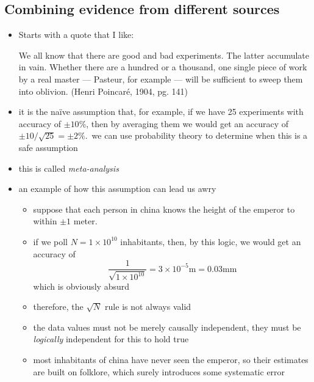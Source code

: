 \documentclass[../jaynes_prob_theory_notes.tex]{subfiles}
\begin{document}
            \subsection{Combining evidence from different sources}
                \begin{itemize}
                    \item Starts with a quote that I like:
                        \begin{displayquote}
                            We all know that there are good and bad experiments. The latter accumulate in vain. Whether there are a hundred or a thousand, one single piece of work by a real master --- Pasteur, for example --- will be sufficient to sweep them into oblivion. (Henri Poincar\'e, 1904, pg. 141)
                        \end{displayquote}
                    \item it is the na\"ive assumption that, for example, if we have 25 experiments with accuracy of $\pm 10\%$, then by averaging them we would get an accuracy of $\pm10/\sqrt{25} = \pm2\%$.\ we can use probability theory to determine when this is a safe assumption
                    \item this is called \textit{meta-analysis}
                    \item an example of how this assumption can lead us awry
                        \begin{itemize}
                            \item suppose that each person in china knows the height of the emperor to within $\pm 1$ meter.
                            \item if we poll $N = 1 \times 10^{10}$ inhabitants, then, by this logic, we would get an accuracy of
                                \begin{equation*}
                                    \frac{1}{\sqrt{1 \times {10}^{10}}} = 3 \times {10}^{-5} \mathrm{m} = 0.03 \mathrm{mm}
                                \end{equation*}
                                which is obviously absurd
                            \item therefore, the $\sqrt{N}$ rule is not always valid
                            \item the data values must not be merely causally independent, they must be \textit{logically} independent for this to hold true
                            \item most inhabitants of china have never seen the emperor, so their estimates are built on folklore, which surely introduces some systematic error

\end{itemize}
\end{itemize}
\end{document}
